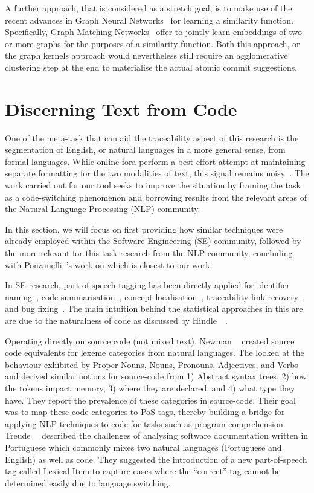 A further approach, that is considered as a stretch goal, is to make use of the
recent advances in Graph Neural Networks~\cite{scarselli2008graph} for learning
a similarity function. Specifically, Graph Matching
Networks~\cite{DBLP:journals/corr/abs-1904-12787} offer to jointly learn
embeddings of two or more graphs for the purposes of a similarity function. Both
this approach, or the graph kernels approach would nevertheless still require an
agglomerative clustering step at the end to materialise the actual atomic commit
suggestions.

\section{Discerning Text from Code}
\label{chapter:literature:sec:posit_rel_work}

One of the meta-task that can aid the traceability aspect of this research is
the segmentation of English, or natural languages in a more general sense, from
formal languages. While online fora perform a best effort attempt at maintaining
separate formatting for the two modalities of text, this signal remains
noisy~\cite{ponzanelli2014improving}. The work carried out for our tool seeks to
improve the situation by framing the task as a code-switching phenomenon and
borrowing results from the relevant areas of the Natural Language Processing
(NLP) community.

In this section, we will focus on first providing how similar techniques were
already employed within the Software Engineering (SE) community, followed by the
more relevant for this task research from the NLP community, concluding with
Ponzanelli~\etal's work on \SO which is closest to our work.

In SE research, part-of-speech tagging has been directly applied for identifier
naming~\cite{Binkley2011}, code summarisation~\cite{Haiduc2010a, Haiduc2010b},
concept localisation~\cite{Abebe2010}, traceability-link
recovery~\cite{Capobianco2013}, and bug fixing~\cite{Tian2015}. The main
intuition behind the statistical approaches in this are are due to the
naturalness of code as discussed by Hindle~\etal~\cite{hindle2012naturalness}.

Operating directly on source code (not mixed text), Newman
\etal~\cite{Newman2017} created source code equivalents for lexeme categories
from natural languages. The looked at the behaviour exhibited by Proper Nouns,
Nouns, Pronouns, Adjectives, and Verbs and derived similar notions for
source-code from 1) Abstract syntax trees, 2) how the tokens impact memory, 3)
where they are declared, and 4) what type they have. They report the prevalence
of these categories in source-code. Their goal was to map these code categories
to PoS tags, thereby building a bridge for applying NLP techniques to code for
tasks such as program comprehension. Treude~\etal~\cite{Treude2015portuguese}
described the challenges of analysing software documentation written in
Portuguese which commonly mixes two natural languages (Portuguese and English)
as well as code. They suggested the introduction of a new part-of-speech tag
called Lexical Item to capture cases where the ``correct'' tag cannot be
determined easily due to language switching.

